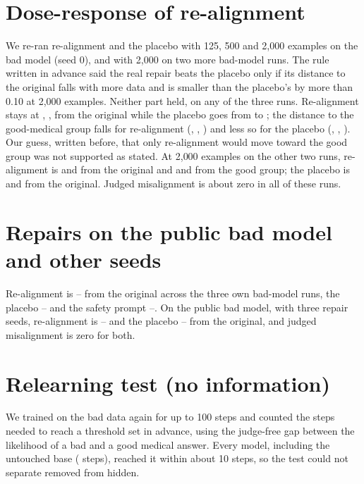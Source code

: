 \documentclass[10pt]{article}
\begin{document}


\section{Dose-response of re-alignment}\label{app:dose}
We re-ran re-alignment and the placebo with 125, 500 and 2{,}000 examples on the bad model (seed 0), and with 2{,}000 on two more bad-model runs. The rule written in advance said the real repair beats the placebo only if its distance to the original falls with more data and is smaller than the placebo's by more than 0.10 at 2{,}000 examples. Neither part held, on any of the three runs. Re-alignment stays at \doseRealignLoBase{}, \doseRealignMidBase{}, \doseRealignHiBase{} from the original while the placebo goes from \dosePlaceboLoBase{} to \dosePlaceboHiBase; the distance to the good-medical group falls for re-alignment (\doseRealignLoGood{}, \doseRealignMidGood{}, \doseRealignHiGood) and less so for the placebo (\dosePlaceboLoGood{}, \dosePlaceboMidGood{}, \dosePlaceboHiGood). Our guess, written before, that only re-alignment would move toward the good group was not supported as stated. At 2{,}000 examples on the other two runs, re-alignment is \doseHiRealignSOneBase{} and \doseHiRealignSTwoBase{} from the original and \doseHiRealignSOneGood{} and \doseHiRealignSTwoGood{} from the good group; the placebo is \doseHiPlaceboSOneBase{} and \doseHiPlaceboSTwoBase{} from the original. Judged misalignment is about zero in all of these runs.

\section{Repairs on the public bad model and other seeds}
Re-alignment is \realignRangeLo--\realignRangeHi{} from the original across the three own bad-model runs, the placebo \placeboRangeLo--\placeboRangeHi{} and the safety prompt \promptRangeLo--\promptRangeHi. On the public bad model, with three repair seeds, re-alignment is \pubRealignLo--\pubRealignHi{} and the placebo \pubPlaceboLo--\pubPlaceboHi{} from the original, and judged misalignment is zero for both.

\section{Relearning test (no information)}\label{app:relearn}
We trained on the bad data again for up to 100 steps and counted the steps needed to reach a threshold set in advance, using the judge-free gap between the likelihood of a bad and a good medical answer. Every model, including the untouched base (\rlBaseSteps{} steps), reached it within about 10 steps, so the test could not separate removed from hidden.
\end{document}
